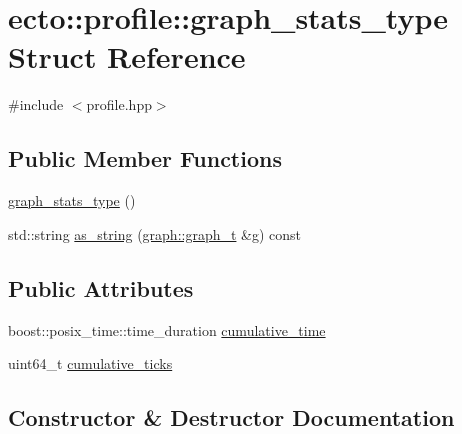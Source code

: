 \hypertarget{structecto_1_1profile_1_1graph__stats__type}{}\section{ecto\+:\+:profile\+:\+:graph\+\_\+stats\+\_\+type Struct Reference}
\label{structecto_1_1profile_1_1graph__stats__type}


{\ttfamily \#include $<$profile.\+hpp$>$}

\subsection*{Public Member Functions}
\begin{DoxyCompactItemize}
\item 
\hyperlink{structecto_1_1profile_1_1graph__stats__type_aefc20d119cb949420bf74e845a8a1e8c}{graph\+\_\+stats\+\_\+type} ()
\item 
std\+::string \hyperlink{structecto_1_1profile_1_1graph__stats__type_ab412a3b91cbd9b062cdcd0f078ca163d}{as\+\_\+string} (\hyperlink{structecto_1_1graph_1_1graph__t}{graph\+::graph\+\_\+t} \&g) const 
\end{DoxyCompactItemize}
\subsection*{Public Attributes}
\begin{DoxyCompactItemize}
\item 
boost\+::posix\+\_\+time\+::time\+\_\+duration \hyperlink{structecto_1_1profile_1_1graph__stats__type_a340d79ae72ca5639e55098c860640ba8}{cumulative\+\_\+time}
\item 
uint64\+\_\+t \hyperlink{structecto_1_1profile_1_1graph__stats__type_a0d465d23569a8af1789c0b57ccb21017}{cumulative\+\_\+ticks}
\end{DoxyCompactItemize}


\subsection{Constructor \& Destructor Documentation}
\hypertarget{structecto_1_1profile_1_1graph__stats__type_aefc20d119cb949420bf74e845a8a1e8c}{}
